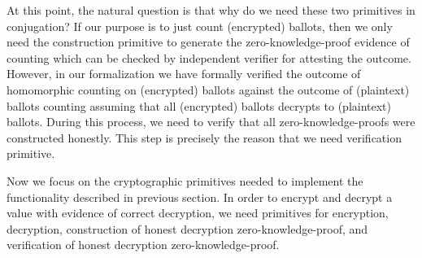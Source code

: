 \documentclass{llncs}
\begin{document}
At this point, the natural question is that
why do we need these two primitives in conjugation? If our purpose 
is to just count (encrypted) ballots, then we only need 
the construction primitive
to generate the zero-knowledge-proof evidence of counting which can be
checked by independent verifier for attesting the outcome.
However, in our formalization we have formally 
verified the outcome of homomorphic counting 
on (encrypted) ballots against the outcome of (plaintext) ballots
counting \cite{Pattinson:2017:SVE} assuming that all (encrypted) ballots 
decrypts to (plaintext) ballots. During this process, we need to verify that 
all zero-knowledge-proofs were constructed honestly. This step 
is precisely the reason that we need verification primitive.  
%

   
Now we focus on the  cryptographic primitives needed to implement 
the functionality described in previous section. 
In order to encrypt and decrypt a value with 
evidence of correct decryption, we need primitives for encryption, 
decryption, construction of
honest decryption zero-knowledge-proof, and verification of 
honest decryption zero-knowledge-proof.
%
\end{document}
